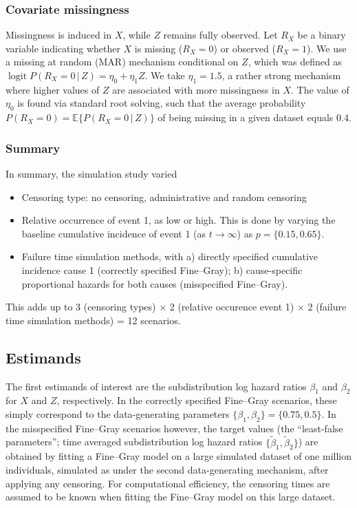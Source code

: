 \documentclass[
  letterpaper,
  paper=240mm:170mm,
  twoside=true,
  open=right,
  fontsize=10pt,
  pagesize=false,
  BCOR=15mm,
  DIV=14,
  headinclude=true,
  footinclude=false,
  headsepline=on]{scrbook}
\providecommand{\tightlist}{%
  \setlength{\itemsep}{0pt}\setlength{\parskip}{0pt}}\usepackage{longtable,booktabs,array}
\DeclareMathOperator{\logit}{logit}
\newcommand{\given}{\,|\,}
\begin{document}
\subsubsection{Covariate missingness}\label{covariate-missingness}

Missingness is induced in \(X\), while \(Z\) remains fully observed. Let
\(R_X\) be a binary variable indicating whether \(X\) is missing
(\(R_X = 0\)) or observed (\(R_X = 1\)). We use a missing at random
(MAR) mechanism conditional on \(Z\), which was defined as
\(\logit P(R_X = 0 \given Z) = \eta_0 + \eta_1 Z\). We take
\(\eta_1 = 1.5\), a rather strong mechanism where higher values of \(Z\)
are associated with more missingness in \(X\). The value of \(\eta_0\)
is found via standard root solving, such that the average probability
\(P(R_X = 0) = \mathbb{E}\{P(R_X = 0 \given Z)\}\) of being missing in a
given dataset equals 0.4.

\subsubsection{Summary}\label{summary}

In summary, the simulation study varied

\begin{itemize}
\tightlist
\item
  Censoring type: no censoring, administrative and random censoring
\item
  Relative occurrence of event 1, as low or high. This is done by
  varying the baseline cumulative incidence of event 1 (as
  \(t \rightarrow \infty\)) as \(p = \{0.15, 0.65\}\).
\item
  Failure time simulation methods, with a) directly specified cumulative
  incidence cause 1 (correctly specified Fine--Gray); b) cause-specific
  proportional hazards for both causes (misspecified Fine--Gray).
\end{itemize}

This adds up to 3 (censoring types) \(\times\) 2 (relative occurence
event 1) \(\times\) 2 (failure time simulation methods) = 12 scenarios.

\subsection{Estimands}\label{estimands-1}

The first estimands of interest are the subdistribution log hazard
ratios \(\beta_{1}\) and \(\beta_{2}\) for \(X\) and \(Z\),
respectively. In the correctly specified Fine--Gray scenarios, these
simply correspond to the data-generating parameters
\(\{\beta_{1},\beta_{2}\} = \{0.75, 0.5\}\). In the misspecified
Fine--Gray scenarios however, the target values (the ``least-false
parameters''; time averaged subdistribution log hazard ratios
\(\{\tilde{\beta}_{1},\tilde{\beta}_{2}\}\)) are obtained by fitting a
Fine--Gray model on a large simulated dataset of one million
individuals, simulated as under the second data-generating mechanism,
after applying any censoring. For computational efficiency, the
censoring times are assumed to be known when fitting the Fine--Gray
model on this large dataset.
\end{document}
